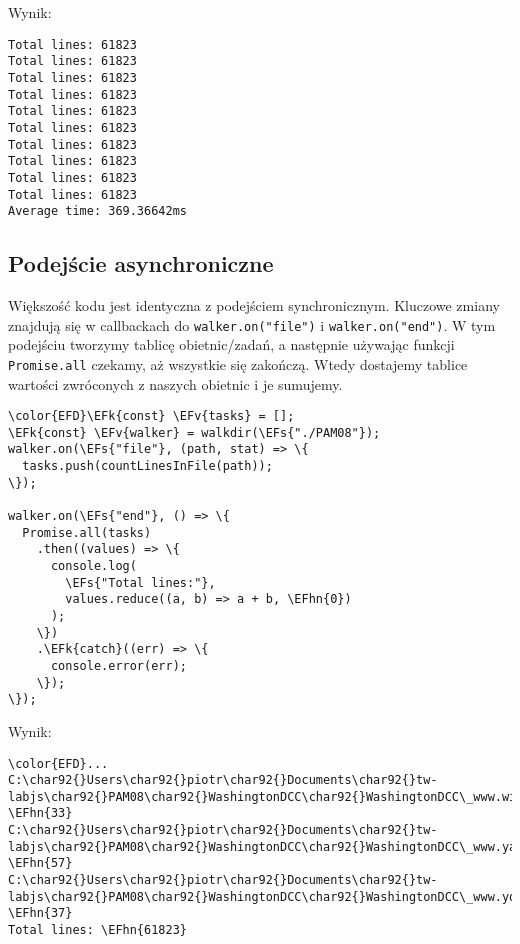 \documentclass[11pt]{article}
\newcommand{\EFs}[1]{\textcolor{EFs}{#1}} %
\newcommand{\EFk}[1]{\textcolor{EFk}{#1}} %
\newcommand{\EFv}[1]{\textcolor{EFv}{#1}} %
\newcommand{\EFhn}[1]{\textcolor{EFhn}{#1}} %
\begin{document}
Wynik:
\begin{tcolorbox}
\begin{Verbatim}
Total lines: 61823
Total lines: 61823
Total lines: 61823
Total lines: 61823
Total lines: 61823
Total lines: 61823
Total lines: 61823
Total lines: 61823
Total lines: 61823
Total lines: 61823
Average time: 369.36642ms
\end{Verbatim}

\end{tcolorbox}
\subsection*{Podejście asynchroniczne}
\label{sec:org571dc33}
Większość kodu jest identyczna z podejściem synchronicznym.
Kluczowe zmiany znajdują się w callbackach do \texttt{walker.on("file")}
i \texttt{walker.on("end")}. W tym podejściu tworzymy tablicę
obietnic/zadań, a następnie używając funkcji \texttt{Promise.all} czekamy, aż
wszystkie się zakończą. Wtedy dostajemy tablice wartości
zwróconych z naszych obietnic i je sumujemy.

\begin{Code}
\begin{Verbatim}
\color{EFD}\EFk{const} \EFv{tasks} = [];
\EFk{const} \EFv{walker} = walkdir(\EFs{"./PAM08"});
walker.on(\EFs{"file"}, (path, stat) => \{
  tasks.push(countLinesInFile(path));
\});

walker.on(\EFs{"end"}, () => \{
  Promise.all(tasks)
    .then((values) => \{
      console.log(
        \EFs{"Total lines:"},
        values.reduce((a, b) => a + b, \EFhn{0})
      );
    \})
    .\EFk{catch}((err) => \{
      console.error(err);
    \});
\});
\end{Verbatim}
\end{Code}

Wynik:
\begin{Code}
\begin{Verbatim}
\color{EFD}...
C:\char92{}Users\char92{}piotr\char92{}Documents\char92{}tw-labjs\char92{}PAM08\char92{}WashingtonDCC\char92{}WashingtonDCC\_www.wikipedia.org.html \EFhn{33}
C:\char92{}Users\char92{}piotr\char92{}Documents\char92{}tw-labjs\char92{}PAM08\char92{}WashingtonDCC\char92{}WashingtonDCC\_www.yahoo.com.html \EFhn{57}
C:\char92{}Users\char92{}piotr\char92{}Documents\char92{}tw-labjs\char92{}PAM08\char92{}WashingtonDCC\char92{}WashingtonDCC\_www.youtube.com.html \EFhn{37}
Total lines: \EFhn{61823}
\end{Verbatim}
\end{Code}
\end{document}
